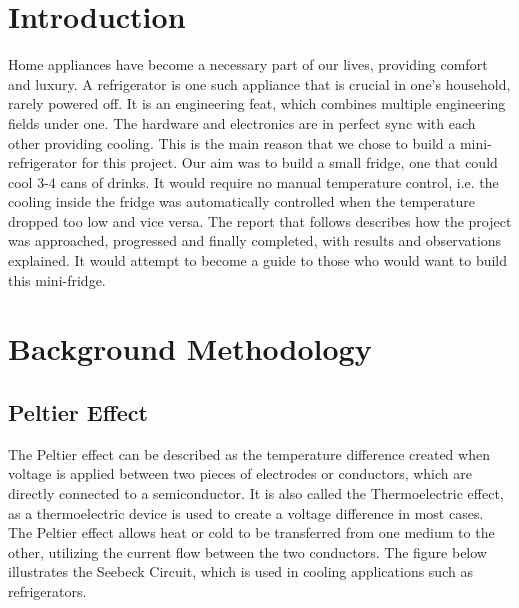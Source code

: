 \documentclass[12pt,onecolumn]{article}
\begin{document}

\newpage
\tableofcontents

\newpage
\section{Introduction}
Home appliances have become a necessary part of our lives, providing comfort and luxury. A refrigerator is one such appliance that is crucial in one's household, rarely powered off. It is an engineering feat, which combines multiple engineering fields under one. The hardware and electronics are in perfect sync with each other providing cooling. This is the main reason that we chose to build a mini-refrigerator for this project. Our aim was to build a small fridge, one that could cool 3-4 cans of drinks. It would require no manual temperature control, i.e. the cooling inside the fridge was automatically controlled when the temperature dropped too low and vice versa. The report that follows describes how the project was approached, progressed and finally completed, with results and observations explained. It would attempt to become a guide to those who would want to build this mini-fridge. 

\section{Background Methodology}
\subsection{Peltier Effect}
The Peltier effect can be described as the temperature difference created when voltage is applied between two pieces of electrodes or conductors, which are directly connected to a semiconductor. It is also called the Thermoelectric effect, as a thermoelectric device is used to create a voltage difference in most cases. The Peltier effect allows heat or cold to be transferred from one medium to the other, utilizing the current flow between the two conductors. The figure below illustrates the Seebeck Circuit, which is used in cooling applications such as refrigerators. 
\end{document}
